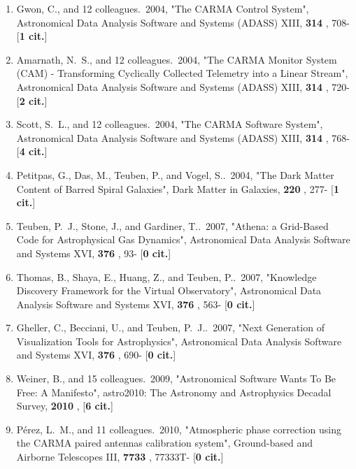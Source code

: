 \documentclass[11pt,letterpaper]{article}
\begin{document}
\begin{enumerate}[resume,label=\textbf{\arabic*}.]
\item  
Gwon, C., and 12 colleagues.\  2004,  "The CARMA Control System", 
Astronomical Data Analysis Software and Systems (ADASS) XIII,  {\bf 314} , 
708- [{\bf 1 cit.}] 

\item  
Amarnath, N.~S., and 12 colleagues.\  2004,  "The CARMA Monitor System 
(CAM) - Transforming Cyclically Collected Telemetry into a Linear Stream", 
Astronomical Data Analysis Software and Systems (ADASS) XIII,  {\bf 314} , 
720- [{\bf 2 cit.}] 

\item  
Scott, S.~L., and 12 colleagues.\  2004,  "The CARMA Software System", 
Astronomical Data Analysis Software and Systems (ADASS) XIII,  {\bf 314} , 
768- [{\bf 4 cit.}] 

\item  
Petitpas, G., Das, M., Teuben, P., and Vogel, S..\  2004,  "The Dark Matter 
Content of Barred Spiral Galaxies", Dark Matter in Galaxies,  {\bf 220} , 
277- [{\bf 1 cit.}] 


\item  
Teuben, P.~J., Stone, J., and Gardiner, T..\  2007,  "Athena: a Grid-Based 
Code for Astrophysical Gas Dynamics", Astronomical Data Analysis Software 
and Systems XVI,  {\bf 376} , 93- [{\bf 0 cit.}] 

\item  
Thomas, B., Shaya, E., Huang, Z., and Teuben, P..\  2007,  "Knowledge 
Discovery Framework for the Virtual Observatory", Astronomical Data 
Analysis Software and Systems XVI,  {\bf 376} , 563- [{\bf 0 cit.}] 

\item  
Gheller, C., Becciani, U., and Teuben, P.~J..\  2007,  "Next Generation of 
Visualization Tools for Astrophysics", Astronomical Data Analysis Software 
and Systems XVI,  {\bf 376} , 690- [{\bf 0 cit.}] 

\item  
Weiner, B., and 15 colleagues.\  2009,  "Astronomical Software Wants To Be 
Free: A Manifesto", astro2010: The Astronomy and Astrophysics Decadal 
Survey,  {\bf 2010} ,  [{\bf 6 cit.}] 


\item  
P{\'e}rez, L.~M., and 11 colleagues.\  2010,  "Atmospheric phase correction 
using the CARMA paired antennas calibration system", Ground-based and 
Airborne Telescopes III,  {\bf 7733} , 77333T- [{\bf 0 cit.}] 




\end{enumerate}
\end{document}
